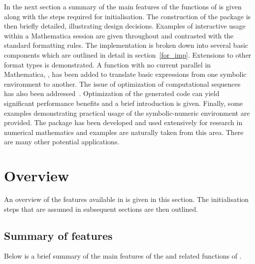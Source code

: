 \documentclass [12pt,twoside]{article}
\begin{document}
In the next section a summary of the main features of the  functions of
 is given along with the steps required for initialisation. The
construction of the package is then briefly detailed, illustrating design
decisions. Examples of interactive usage within a Mathematica session are given throughout and
contrasted with the standard formatting rules. The implementation is broken down into several
basic components which are outlined in detail in section~\ref{for_imp}. Extensions to other
format types is demonstrated. A function with no current parallel in Mathematica,
, has been added to translate basic expressions from one symbolic
environment to another. The issue of optimization of computational sequences has also been
addressed~\cite{me93c}. Optimization of the generated code can yield significant performance
benefits and a brief introduction is given. Finally, some examples demonstrating practical
usage of the symbolic-numeric environment are provided. The package has been developed and
used extensively for research in numerical mathematics and examples are
naturally taken from this area. There are many other potential applications.

\pagebreak[2]

\section{Overview}
An overview of the features available in  is given in this section.
The initialisation steps that are assumed in subsequent sections are then outlined.

\subsection{Summary of features}
Below is a brief summary of the main features of the
 and related functions of .
\end{document}

